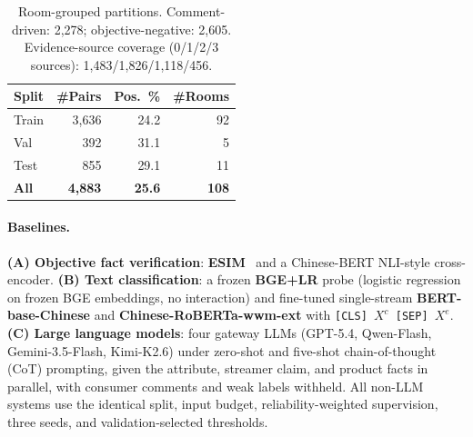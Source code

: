 \begin{table}[t]
\centering\small
\setlength{\tabcolsep}{5pt}
\begin{tabular}{lrrr}
\toprule
\textbf{Split} & \textbf{\#Pairs} & \textbf{Pos.\ \%} & \textbf{\#Rooms} \\
\midrule
Train & 3{,}636 & 24.2 & 92 \\
Val   & 392     & 31.1 & 5  \\
Test  & 855     & 29.1 & 11 \\
\midrule
\textbf{All} & \textbf{4{,}883} & \textbf{25.6} & \textbf{108} \\
\bottomrule
\end{tabular}
\caption{Room-grouped partitions. Comment-driven: 2{,}278; objective-negative:
2{,}605. Evidence-source coverage (0/1/2/3 sources): 1{,}483/1{,}826/1{,}118/456.}
\label{tab:data}
\end{table}

\paragraph{Baselines.}
\textbf{(A) Objective fact verification}: \textbf{ESIM}~\cite{chen2017esim} and a
Chinese-BERT NLI-style cross-encoder. \textbf{(B) Text classification}: a frozen
\textbf{BGE+LR} probe (logistic regression on frozen BGE embeddings, no
interaction) and fine-tuned single-stream \textbf{BERT-base-Chinese} and
\textbf{Chinese-RoBERTa-wwm-ext} with \texttt{[CLS]\,$X^c$\,[SEP]\,$X^e$}.
\textbf{(C) Large language models}: four gateway LLMs (GPT-5.4, Qwen-Flash,
Gemini-3.5-Flash, Kimi-K2.6) under zero-shot and five-shot chain-of-thought
(CoT) prompting, given the attribute, streamer claim, and product facts in
parallel, with consumer comments and weak labels withheld. All non-LLM systems
use the identical split, input budget, reliability-weighted supervision, three
seeds, and validation-selected thresholds.

